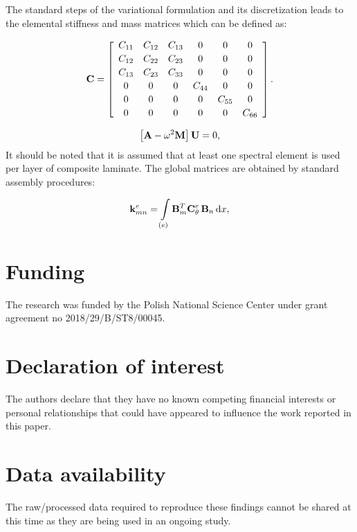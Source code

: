 	 The standard steps of the variational formulation and its discretization leads to the elemental stiffness and mass matrices which can be defined as:
	 
\begin{equation}
 \mathbf{C} = \left[\begin{array}{cccccc} C_{11} & C_{12}& C_{13} & 0&0&0\\[2pt]
 C_{12}& C_{22} & C_{23}& 0&0&0\\[2pt]
 C_{13}&C_{23}&C_{33}&0&0&0\\[2pt]
 0& 0 &0&C_{44}& 0&0\\[2pt]
 0&0&0&0&C_{55}&0\\[2pt]
  0&0&0&0&0&C_{66}
  \end{array}\right]. 
 \label{eq:elastic_constatns}\end{equation}
	 
\begin{equation}
	\left[\mathbf{A} - \omega^2\mathbf{M} \right] \mathbf{U} =0,
\label{eq:eig_dispersion}\end{equation}
 	It should be noted that it is assumed that at least one spectral element is used per layer of composite laminate.
 	The global matrices are obtained by standard assembly procedures:
 	
\begin{equation}
	 \mathbf{k}_{mn}^e= \int \limits_{(e)} \mathbf{B}_m^{T} \mathbf{C}_{\theta}^e \, \mathbf{B}_n\, \mathrm{d} x ,
	\label{eq:stiffness_matrix}	
	\end{equation}
	
	
\section*{Funding}
   The research was funded by the Polish National Science Center under grant agreement no 2018/29/B/ST8/00045. 
	
	
\section*{Declaration of interest}
	The authors declare that they have no known competing financial interests or personal relationships that could have appeared to influence the work reported in this paper.
	
	
\section*{Data availability}
	The raw/processed data required to reproduce these findings cannot be shared at this time as they are being used in an ongoing study.
	
	
	
	
	
	
	
	
	
    
	


